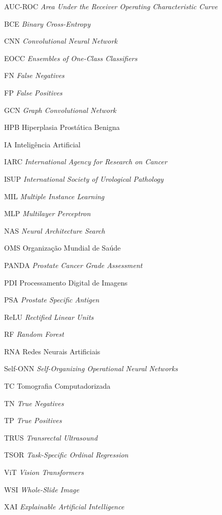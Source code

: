 \documentclass[
12pt,				%
oneside,			%
a4paper,			%
english,			%
french,				%
spanish,			%
brazil				%
]{abntex2}
\begin{document}
		\begin{siglas}
			\item[AUC-ROC] \textit{Area Under the Receiver Operating Characteristic Curve}
			\item[BCE] \textit{Binary Cross-Entropy}
			\item[CNN] \textit{Convolutional Neural Network}
			\item[EOCC] \textit{Ensembles of One-Class Classifiers}
			\item[FN] \textit{False Negatives}
			\item[FP] \textit{False Positives}
			\item[GCN] \textit{Graph Convolutional Network}
			\item[HPB] Hiperplasia Prostática Benigna
			\item[IA] Inteligência Artificial
			\item[IARC] \textit{International Agency for Research on Cancer}
			\item[ISUP] \textit{International Society of Urological Pathology}
			\item[MIL] \textit{Multiple Instance Learning}
			\item[MLP] \textit{Multilayer Perceptron}
			\item[NAS] \textit{Neural Architecture Search}
			\item[OMS] Organização Mundial de Saúde
			\item[PANDA] \textit{Prostate Cancer Grade Assessment}
			\item[PDI] Processamento Digital de Imagens
			\item[PSA] \textit{Prostate Specific Antigen}
			\item[ReLU] \textit{Rectified Linear Units}
			\item[RF] \textit{Random Forest}
			\item[RNA] Redes Neurais Artificiais
			\item[Self-ONN] \textit{Self-Organizing Operational Neural Networks}
			\item[TC] Tomografia Computadorizada
			\item[TN] \textit{True Negatives} 
			\item[TP] \textit{True Positives} 
			\item[TRUS] \textit{Transrectal Ultrasound}
			\item[TSOR] \textit{Task-Specific Ordinal Regression}
			\item[ViT] \textit{Vision Transformers}
			\item[WSI] \textit{Whole-Slide Image}
			\item[XAI] \textit{Explainable Artificial Intelligence}
		\end{siglas}
		
\end{document}
